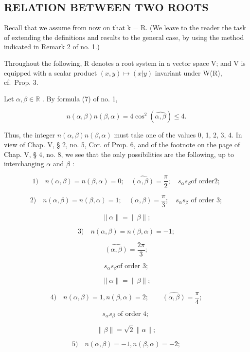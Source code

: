 \subsection{RELATION BETWEEN TWO ROOTS}

Recall that we assume from now on that k = R. (We leave to the reader the task of extending the definitions and results to the general case, by using the method indicated in Remark 2 of no. 1.)

Throughout the following, R denotes a root system in a vector space V; and V is equipped with a scalar product \((x,y)\mapsto(x|y)\) invariant under W(R), cf.~Prop. 3.

Let \(\alpha, \beta \in \mathbb{R}\) . By formula (7) of no. 1,

\[
n (\alpha , \beta) n (\beta , \alpha) = 4 \cos^ {2} (\widehat {\alpha , \beta}) \leqslant 4.\tag{10}
\]

Thus, the integer \(n(\alpha,\beta)n(\beta,\alpha)\) must take one of the values 0, 1, 2, 3, 4. In view of Chap. V, § 2, no. 5, Cor. of Prop. 6, and of the footnote on the page of Chap. V, § 4, no. 8, we see that the only possibilities are the following, up to interchanging \(\alpha\) and \(\beta\) :

\[
1) \quad n (\alpha , \beta) = n (\beta , \alpha) = 0; \quad \widehat {(\alpha , \beta)} = \frac {\pi}{2}; \quad s _ {\alpha} s _ {\beta} \text {of order} 2;
\]

\[
2) \quad n (\alpha , \beta) = n (\beta , \alpha) = 1; \quad (\alpha , \beta) = \frac {\pi}{3}; \quad s _ {\alpha} s _ {\beta} \text {   of   order   } 3;
\]

\[
\parallel \alpha \parallel = \parallel \beta \parallel ;
\]

\[
3) \quad n (\alpha , \beta) = n (\beta , \alpha) = - 1;
\]

\[
\widehat {(\alpha , \beta)} = \frac {2 \pi}{3};
\]

\[
s _ {\alpha} s _ {\beta} \text {of order 3};
\]

\[
\| \alpha \| = \| \beta \|;
\]

\[
4) \quad n (\alpha , \beta) = 1, n (\beta , \alpha) = 2; \qquad \widehat {(\alpha , \beta)} = \frac {\pi}{4};
\]

\[
s _ {\alpha} s _ {\beta} \text {   of   order   4;   }
\]

\[
\parallel \beta \parallel = \sqrt {2} \parallel \alpha \parallel ;
\]

\[
5) \quad n (\alpha , \beta) = - 1, n (\beta , \alpha) = - 2;
\]

